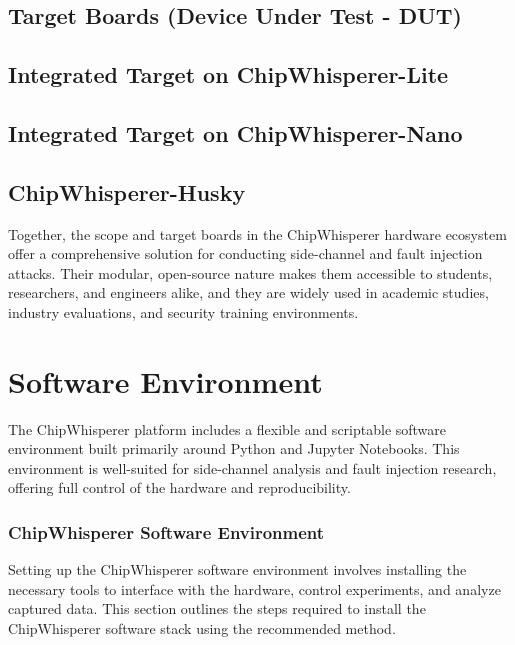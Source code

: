 \subsection{Target Boards (Device Under Test - DUT)}

\subsection{Integrated Target on ChipWhisperer-Lite}

\subsection{Integrated Target on ChipWhisperer-Nano}

\subsection{ChipWhisperer-Husky}

Together, the scope and target boards in the ChipWhisperer hardware ecosystem offer a comprehensive solution for conducting side-channel and fault injection attacks. Their modular, open-source nature makes them accessible to students, researchers, and engineers alike, and they are widely used in academic studies, industry evaluations, and security training environments.

\section{Software Environment}
The ChipWhisperer platform includes a flexible and scriptable software environment built primarily around Python and Jupyter Notebooks. This environment is well-suited for side-channel analysis and fault injection research, offering full control of the hardware and reproducibility. 
\subsubsection{ChipWhisperer Software Environment}
 Setting up the ChipWhisperer software environment involves installing the necessary tools to interface with the hardware, control experiments, and analyze captured data. This section outlines the steps required to install the ChipWhisperer software stack using the recommended method.
